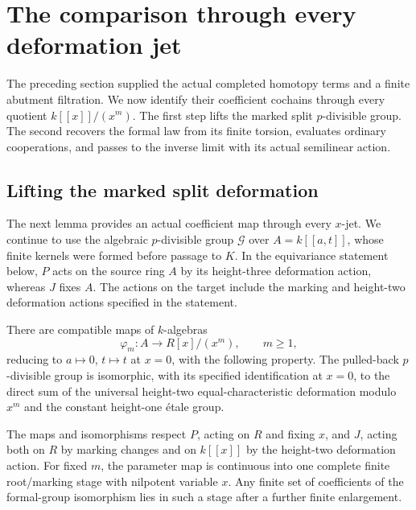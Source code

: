 \section{The comparison through every deformation jet}\label{sec:jets}

The preceding section supplied the actual completed homotopy terms and a
finite abutment filtration. We now identify their coefficient cochains
through every quotient \(k[[x]]/(x^m)\). The first step lifts the marked
split \(p\)-divisible group. The second recovers the formal law from its
finite torsion, evaluates ordinary cooperations, and passes to the inverse
limit with its actual semilinear action.

\subsection{Lifting the marked split deformation}

The next lemma provides an actual coefficient map through every
$x$-jet.  We continue to use the algebraic $p$-divisible group
$\mathcal G$ over $A=k[[a,t]]$, whose finite kernels were formed
before passage to $K$. In the equivariance statement below, $P$ acts
on the source ring $A$ by its height-three deformation action, whereas
$J$ fixes $A$. The actions on the target include the marking and
height-two deformation actions specified in the statement.

\begin{lemma}\label{lem:split-jet-lift}
There are compatible maps of $k$-algebras
\begin{equation}\label{eq:split-parameter-map}
  \varphi_m:A\longrightarrow R[x]/(x^m),\qquad m\geq1,
\end{equation}
reducing to $a\mapsto0$, $t\mapsto t$ at $x=0$, with the following
property.  The pulled-back $p$-divisible group is isomorphic, with its
specified identification at $x=0$, to the direct sum of the universal
height-two equal-characteristic deformation modulo $x^m$ and the
constant height-one \'{e}tale group.

The maps and isomorphisms respect $P$, acting on $R$ and fixing $x$,
and $J$, acting both on $R$ by marking changes and on $k[[x]]$ by the
height-two deformation action.  For fixed $m$, the parameter map is
continuous into one complete finite root/marking stage with nilpotent
variable $x$.  Any finite set of coefficients of the formal-group
isomorphism lies in such a stage after a further finite enlargement.
\end{lemma}

